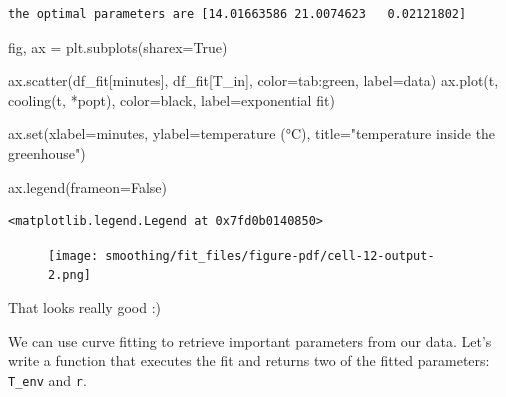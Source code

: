 \documentclass[
  letterpaper,
  DIV=11,
  numbers=noendperiod,
  oneside]{scrreprt}
\newenvironment{Shaded}{\begin{snugshade}}{\end{snugshade}}
\newcommand{\BuiltInTok}[1]{\textcolor[rgb]{0.00,0.23,0.31}{#1}}
\newcommand{\NormalTok}[1]{\textcolor[rgb]{0.00,0.23,0.31}{#1}}
\newcommand{\OperatorTok}[1]{\textcolor[rgb]{0.37,0.37,0.37}{#1}}
\newcommand{\StringTok}[1]{\textcolor[rgb]{0.13,0.47,0.30}{#1}}
\newcommand{\VariableTok}[1]{\textcolor[rgb]{0.07,0.07,0.07}{#1}}
\begin{document}
\begin{verbatim}
the optimal parameters are [14.01663586 21.0074623   0.02121802]
\end{verbatim}

\begin{Shaded}
\begin{Highlighting}[]
\NormalTok{fig, ax }\OperatorTok{=}\NormalTok{ plt.subplots(sharex}\OperatorTok{=}\VariableTok{True}\NormalTok{)}

\NormalTok{ax.scatter(df\_fit[}\StringTok{\textquotesingle{}minutes\textquotesingle{}}\NormalTok{], df\_fit[}\StringTok{\textquotesingle{}T\_in\textquotesingle{}}\NormalTok{],}
\NormalTok{           color}\OperatorTok{=}\StringTok{\textquotesingle{}tab:green\textquotesingle{}}\NormalTok{, label}\OperatorTok{=}\StringTok{\textquotesingle{}data\textquotesingle{}}\NormalTok{)}
\NormalTok{ax.plot(t, cooling(t, }\OperatorTok{*}\NormalTok{popt),}
\NormalTok{        color}\OperatorTok{=}\StringTok{\textquotesingle{}black\textquotesingle{}}\NormalTok{, label}\OperatorTok{=}\StringTok{\textquotesingle{}exponential fit\textquotesingle{}}\NormalTok{)}

\NormalTok{ax.}\BuiltInTok{set}\NormalTok{(xlabel}\OperatorTok{=}\StringTok{\textquotesingle{}minutes\textquotesingle{}}\NormalTok{,}
\NormalTok{       ylabel}\OperatorTok{=}\StringTok{\textquotesingle{}temperature (°C)\textquotesingle{}}\NormalTok{,}
\NormalTok{       title}\OperatorTok{=}\StringTok{"temperature inside the greenhouse"}\NormalTok{)}

\NormalTok{ax.legend(frameon}\OperatorTok{=}\VariableTok{False}\NormalTok{)}
\end{Highlighting}
\end{Shaded}

\begin{verbatim}
<matplotlib.legend.Legend at 0x7fd0b0140850>
\end{verbatim}

\begin{figure}[H]

{\centering \texttt{[image: smoothing/fit\_files/figure-pdf/cell-12-output-2.png]}

}

\end{figure}

That looks really good :)

We can use curve fitting to retrieve important parameters from our data.
Let's write a function that executes the fit and returns two of the
fitted parameters: \texttt{T\_env} and \texttt{r}.
\end{document}
